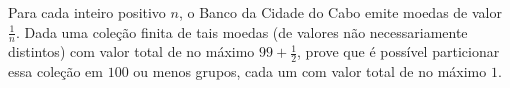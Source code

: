 Para cada inteiro positivo $n$, o Banco da Cidade do Cabo emite moedas de valor $\frac{1}{n}$. Dada uma coleção finita de tais moedas (de valores não necessariamente distintos) com valor total de no máximo $99 + \frac{1}{2}$, prove que é possível particionar essa coleção em $100$ ou menos grupos, cada um com valor total de no máximo $1$.
